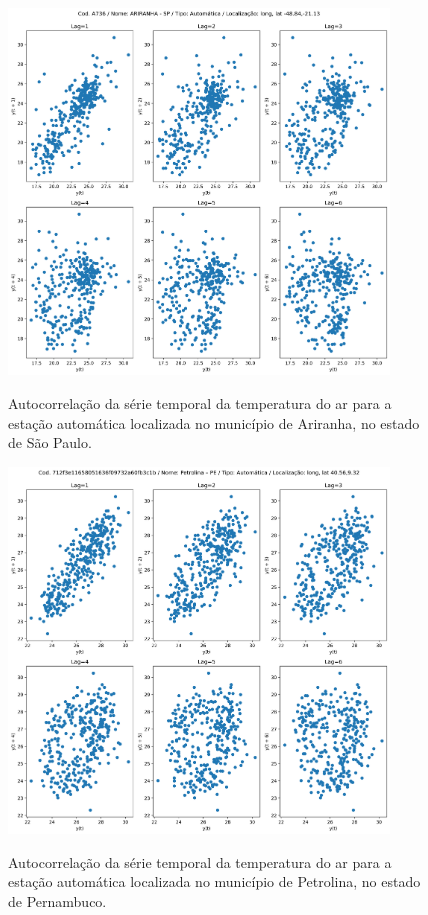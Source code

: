 \begin{figure}[H]
    \centering
    \caption{Autocorrelação da série temporal da temperatura do ar para a estação automática localizada no município de Ariranha, no estado de São Paulo.}
    \includegraphics[width=0.9\textwidth]{figuras/correlacao_A736.png}
    \label{fig:correlacao_2}
\end{figure}

\begin{figure}[H]
    \centering
    \caption{Autocorrelação da série temporal da temperatura do ar para a estação automática localizada no município de Petrolina, no estado de Pernambuco.}
    \includegraphics[width=0.9\textwidth]{figuras/correlacao_712f3e11658051636f09732a60fb3c1b.png}
    \label{fig:correlacao_3}
\end{figure}

